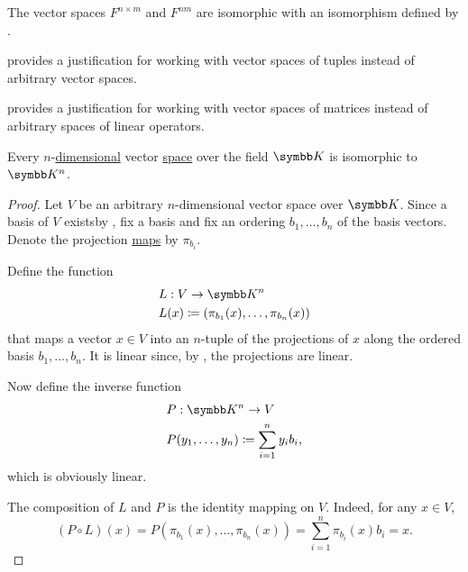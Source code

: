 \begin{proposition}\label{def:matrix_spaces_are_tuple_spaces}
  The vector spaces \( F^{n \times m} \) and \( F^{nm} \) are isomorphic with an isomorphism defined by .
\end{proposition}

\begin{remark}\label{remark:vector_spaces_of_tuples_and_matrices}
   provides a justification for working with vector spaces of tuples instead of arbitrary vector spaces.

   provides a justification for working with vector spaces of matrices instead of arbitrary spaces of linear operators.
\end{remark}

\begin{theorem}\label{thm:finite_dimensional_spaces_are_isomorphic}
  Every \( n \)-\hyperref[def:vector_space_dimension]{dimensional} vector \hyperref[def:vector_space]{space} over the field \( \BK \) is isomorphic to \( \BK^n \).
\end{theorem}
\begin{proof}
  Let \( V \) be an arbitrary \( n \)-dimensional vector space over \( \BK \). Since a basis of \( V \) exists\AOC by , fix a basis and fix an ordering \( b_1, \ldots, b_n \) of the basis vectors. Denote the projection \hyperref[def:left_module_basis_projection]{maps} by \( \pi_{b_i} \).

  Define the function
  \begin{align*}
    &L: V \to \BK^n \\
    &L(x) \coloneqq (\pi_{b_1}(x), \ldots, \pi_{b_n}(x))
  \end{align*}
  that maps a vector \( x \in V \) into an \( n \)-tuple of the projections of \( x \) along the ordered basis \( b_1, \ldots, b_n \). It is linear since, by , the projections are linear.

  Now define the inverse function
  \begin{align*}
    &P: \BK^n \to V \\
    &P(y_1, \ldots, y_n) \coloneqq \sum_{i=1}^n y_i b_i,
  \end{align*}
  which is obviously linear.

  The composition of \( L \) and \( P \) is the identity mapping on \( V \). Indeed, for any \( x \in V \),
  \begin{equation*}
    (P \circ L)(x)
    =
    P(\pi_{b_1}(x), \ldots, \pi_{b_n}(x))
    =
    \sum_{i=1}^n \pi_{b_i}(x) b_i
    =
    x.
  \end{equation*}
\end{proof}

